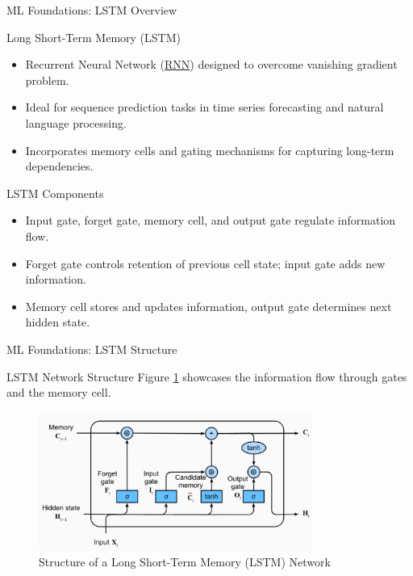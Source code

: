 \documentclass{beamer}
\begin{document}
\begin{frame}{ML Foundations: LSTM Overview}
    \begin{block}{Long Short-Term Memory (LSTM)}\label{appx:lstm}
        \begin{itemize}
            \item Recurrent Neural Network (\hyperref[appx:rnn]{RNN}) designed to overcome vanishing gradient problem.
            \item Ideal for sequence prediction tasks in time series forecasting and natural language processing.
            \item Incorporates memory cells and gating mechanisms for capturing long-term dependencies.
        \end{itemize}
    \end{block}

    \begin{block}{LSTM Components}
        \begin{itemize}
            \item Input gate, forget gate, memory cell, and output gate regulate information flow.
            \item Forget gate controls retention of previous cell state; input gate adds new information.
            \item Memory cell stores and updates information, output gate determines next hidden state.
        \end{itemize}
    \end{block}
\end{frame}

\begin{frame}{ML Foundations: LSTM Structure}
    \begin{block}{LSTM Network Structure}
        Figure \ref{figure:lstm_structure} showcases the information flow through gates and the memory cell.
    \end{block}

    \begin{figure}[ht]
        \centering
        \includegraphics[width=0.8\textwidth]{figure/lstm.png}
        \caption{Structure of a Long Short-Term Memory (LSTM) Network}
        \label{figure:lstm_structure}
    \end{figure}
\end{frame}
\end{document}

